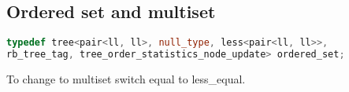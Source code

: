 \subsection{Ordered set and multiset}

\begin{lstlisting}[language=C++]
typedef tree<pair<ll, ll>, null_type, less<pair<ll, ll>>,
rb_tree_tag, tree_order_statistics_node_update> ordered_set;
\end{lstlisting}

\noindent To change to multiset switch equal to less\_equal.